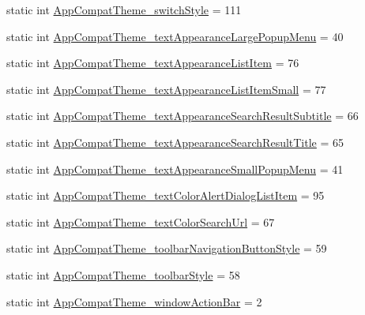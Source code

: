\begin{DoxyCompactItemize}
\item 
static int \hyperlink{classandroid_1_1support_1_1v4_1_1R_1_1styleable_a88c6ebdb5e64556c13f05c1525c8ef99}{App\+Compat\+Theme\+\_\+switch\+Style} = 111
\item 
static int \hyperlink{classandroid_1_1support_1_1v4_1_1R_1_1styleable_a946d0cdb84dc252db74ba6bd92a139c3}{App\+Compat\+Theme\+\_\+text\+Appearance\+Large\+Popup\+Menu} = 40
\item 
static int \hyperlink{classandroid_1_1support_1_1v4_1_1R_1_1styleable_afb0912c36e3e09d6a8e93507b65bf499}{App\+Compat\+Theme\+\_\+text\+Appearance\+List\+Item} = 76
\item 
static int \hyperlink{classandroid_1_1support_1_1v4_1_1R_1_1styleable_a7130801a509563566260e6edc992a049}{App\+Compat\+Theme\+\_\+text\+Appearance\+List\+Item\+Small} = 77
\item 
static int \hyperlink{classandroid_1_1support_1_1v4_1_1R_1_1styleable_aa2cece194eee07266ff9a9a5dd1bf22b}{App\+Compat\+Theme\+\_\+text\+Appearance\+Search\+Result\+Subtitle} = 66
\item 
static int \hyperlink{classandroid_1_1support_1_1v4_1_1R_1_1styleable_aa8c47e569f9386614f689cf93446e929}{App\+Compat\+Theme\+\_\+text\+Appearance\+Search\+Result\+Title} = 65
\item 
static int \hyperlink{classandroid_1_1support_1_1v4_1_1R_1_1styleable_a75e7751d6580449963f139fd3c4efd52}{App\+Compat\+Theme\+\_\+text\+Appearance\+Small\+Popup\+Menu} = 41
\item 
static int \hyperlink{classandroid_1_1support_1_1v4_1_1R_1_1styleable_a635d1d4e8c44021e9a86c648aa1353ac}{App\+Compat\+Theme\+\_\+text\+Color\+Alert\+Dialog\+List\+Item} = 95
\item 
static int \hyperlink{classandroid_1_1support_1_1v4_1_1R_1_1styleable_af247dbb00ad2d383e2bbe1ed27fd7304}{App\+Compat\+Theme\+\_\+text\+Color\+Search\+Url} = 67
\item 
static int \hyperlink{classandroid_1_1support_1_1v4_1_1R_1_1styleable_aa8e0c46e553d29574374131334849630}{App\+Compat\+Theme\+\_\+toolbar\+Navigation\+Button\+Style} = 59
\item 
static int \hyperlink{classandroid_1_1support_1_1v4_1_1R_1_1styleable_add96349c4e4f3a9c0e641cbdfe385992}{App\+Compat\+Theme\+\_\+toolbar\+Style} = 58
\item 
static int \hyperlink{classandroid_1_1support_1_1v4_1_1R_1_1styleable_a13120c866ad32e1b4339a93a131463d6}{App\+Compat\+Theme\+\_\+window\+Action\+Bar} = 2
\item 

\end{DoxyCompactItemize}
